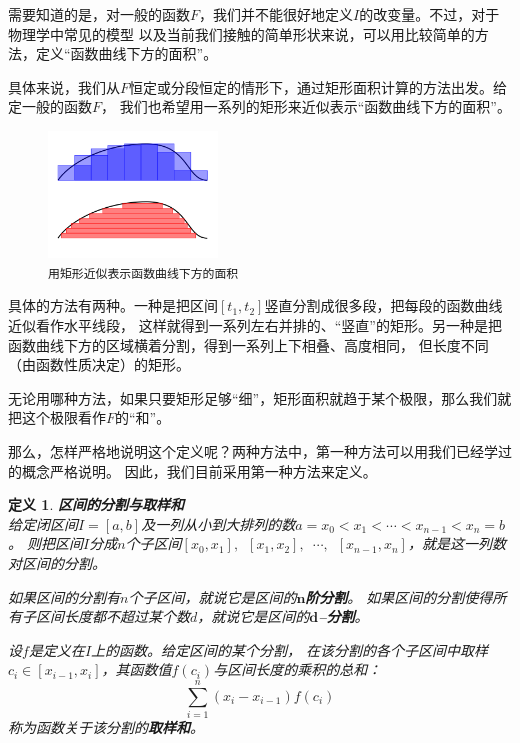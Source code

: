 \documentclass[12pt,UTF8]{ctexbook}
\newtheorem{df}{定义}[section]
\begin{document}
需要知道的是，对一般的函数$F$，我们并不能很好地定义$I$的改变量。不过，对于物理学中常见的模型
以及当前我们接触的简单形状来说，可以用比较简单的方法，定义“函数曲线下方的面积”。

具体来说，我们从$F$恒定或分段恒定的情形下，通过矩形面积计算的方法出发。给定一般的函数$F$，
我们也希望用一系列的矩形来近似表示“函数曲线下方的面积”。

\begin{figure}[h] %
    \vspace{4pt}
    \centering
    \includegraphics[width=0.4\textwidth]{积分定义5.png}
    \caption*{\texttt{用矩形近似表示函数曲线下方的面积}}
\end{figure}

具体的方法有两种。一种是把区间$[t_1, t_2]$竖直分割成很多段，把每段的函数曲线近似看作水平线段，
这样就得到一系列左右并排的、“竖直”的矩形。另一种是把函数曲线下方的区域横着分割，得到一系列上下相叠、高度相同，
但长度不同（由函数性质决定）的矩形。

无论用哪种方法，如果只要矩形足够“细”，矩形面积就趋于某个极限，那么我们就把这个极限看作$F$的“和”。

那么，怎样严格地说明这个定义呢？两种方法中，第一种方法可以用我们已经学过的概念严格说明。
因此，我们目前采用第一种方法来定义。

\begin{df}{\textbf{区间的分割与取样和}}
    \mbox{} \\
    给定闭区间$I=[a, b]$及一列从小到大排列的数$a = x_0 < x_1 < \cdots < x_{n-1} < x_n = b$。
    则把区间$I$分成$n$个子区间$[x_0, x_1], \,\,\, [x_1, x_2], \,\,\,\cdots, \,\,\,[x_{n-1}, x_n]$，就是这一列数对区间的分割。

    如果区间的分割有$n$个子区间，就说它是区间的$\boldsymbol{n}$\textbf{阶分割}。
    如果区间的分割使得所有子区间长度都不超过某个数$d$，就说它是区间的$\boldsymbol{d}$\textbf{–分割}。

    设$f$是定义在$I$上的函数。给定区间的某个分割，
    在该分割的各个子区间中取样$c_i\in [x_{i-1}, x_{i}]$，其函数值$f(c_i)$与区间长度的乘积的总和：
    $$ \sum_{i=1}^n (x_i - x_{i-1}) f(c_i) $$
    称为函数关于该分割的\textbf{取样和}。
\end{df}
\end{document}
